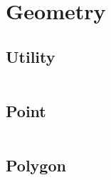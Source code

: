 \section{Geometry}
  \subsection{Utility}
    \inputminted{cpp}{library/geo/geoutil.hpp}
  \subsection{Point}
    \inputminted{cpp}{library/geo/point.hpp}
  \subsection{Polygon}
    \inputminted{cpp}{library/geo/polygon.hpp}
